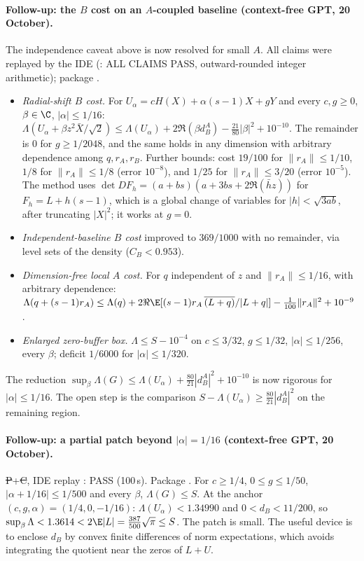 \paragraph{Follow-up: the $B$ cost on an $A$-coupled baseline (context-free GPT, 20 October).} The independence caveat above is now resolved for small $A$. All claims were
replayed by the IDE (: ALL CLAIMS PASS, outward-rounded integer arithmetic); package .
\begin{itemize}
\item \emph{Radial-shift $B$ cost.} For $U_\alpha=cH(X)+\alpha(s-1)X+gY$ and every $c,g\ge0$, $\beta\in\C$, $|\alpha|\le1/16$:
$\Lambda(U_\alpha+\beta z^2\bar X/\sqrt2)\le\Lambda(U_\alpha)+2\Re(\beta d^A_B)-\tfrac{21}{80}|\beta|^2+10^{-10}$. The remainder is $0$ for $g\ge1/2048$, and the same holds in any dimension with
arbitrary dependence among $q,r_A,r_B$. Further bounds: cost $19/100$ for $\|r_A\|\le1/10$, $1/8$ for $\|r_A\|\le1/8$ (error $10^{-8}$), and $1/25$ for $\|r_A\|\le3/20$ (error $10^{-5}$).
The method uses $\det DF_h=(a+bs)(a+3bs+2\Re(\bar hz))$ for $F_h=L+h(s-1)$, which is a global change of variables for $|h|<\sqrt{3ab}$, after truncating $|X|^2$; it works at $g=0$.
\item \emph{Independent-baseline $B$ cost} improved to $369/1000$ with no remainder, via level sets of the density ($C_B<0.953$).
\item \emph{Dimension-free local $A$ cost.} For $q$ independent of $z$ and $\|r_A\|\le1/16$, with arbitrary dependence:
$\Lambda(q+(s-1)r_A)\le\Lambda(q)+2\Re\E[(s-1)r_A\,\overline{(L+q)}/|L+q|]-\tfrac1{100}\|r_A\|^2+10^{-9}$.
\item \emph{Enlarged zero-buffer box.} $\Lambda\le S-10^{-4}$ on $c\le3/32$, $g\le1/32$, $|\alpha|\le1/256$, every $\beta$; deficit $1/6000$ for $|\alpha|\le1/320$.
\end{itemize}
The reduction $\sup_\beta\Lambda(G)\le\Lambda(U_\alpha)+\frac{80}{21}|d^A_B|^2+10^{-10}$ is now rigorous for $|\alpha|\le1/16$. The open step is the comparison
$S-\Lambda(U_\alpha)\ge\frac{80}{21}|d^A_B|^2$ on the remaining region.

\paragraph{Follow-up: a partial patch beyond $|\alpha|=1/16$ (context-free GPT, 20 October).} \st{P}+\st{C}, IDE replay : PASS (100\,s). Package
. For $c\ge1/4$, $0\le g\le1/50$, $|\alpha+1/16|\le1/500$ and every $\beta$, $\Lambda(G)\le S$. At the anchor
$(c,g,\alpha)=(1/4,0,-1/16)$: $\Lambda(U_\alpha)<1.34990$ and $0<d_B<11/200$, so $\sup_\beta\Lambda<1.3614<2\E|L|=\frac{387}{500}\sqrt\pi\le S$. The patch is small. The useful device is to
enclose $d_B$ by convex finite differences of norm expectations, which avoids integrating the quotient near the zeros of $L+U$.

